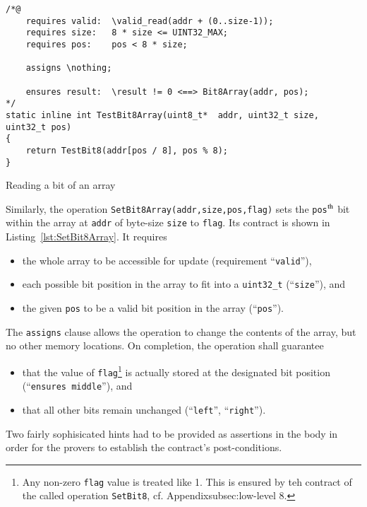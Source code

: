 \begin{listing}[hbt]
\begin{minipage}{0.99\textwidth}
\begin{lstlisting}[style=acsl-block]
/*@
    requires valid:  \valid_read(addr + (0..size-1));
    requires size:   8 * size <= UINT32_MAX;
    requires pos:    pos < 8 * size;

    assigns \nothing;

    ensures result:  \result != 0 <==> Bit8Array(addr, pos);
*/
static inline int TestBit8Array(uint8_t*  addr, uint32_t size, uint32_t pos)
{
    return TestBit8(addr[pos / 8], pos % 8);
}
\end{lstlisting}
\end{minipage}
\caption{\label{lst:TestBit8Array}Reading a bit of an  array}
\end{listing}










Similarly, the operation \lstinline{SetBit8Array(addr,size,pos,flag)} sets the
\lstinline{pos}$^{\mbox{\scriptsize th}}$ bit within the array at \lstinline{addr} of
byte-size \lstinline{size} to \lstinline{flag}.
%
Its contract is shown in Listing~\ref{lst:SetBit8Array}.
%
It requires
%
\begin{itemize}
\item the whole array to be accessible for update (requirement ``\lstinline{valid}''),
\item each possible bit position in the array to fit into a \lstinline{uint32_t}
	(``\lstinline{size}''), and
\item the given \lstinline{pos} to be a valid bit position in the array
	(``\lstinline{pos}'').
\end{itemize}
%
The \lstinline{assigns} clause allows the operation to change the contents of the array,
but no other memory locations.
%
On completion, the operation shall guarantee
\begin{itemize}
\item that the value of \lstinline{flag}\footnote{
	Any non-zero \lstinline{flag} value is treated like 1.
	This is ensured by teh contract of the called operation \lstinline{SetBit8},
	cf. Appendix{subsec:low-level 8}.
	}
	is actually stored at the designated bit
	position (``\lstinline{ensures middle}''), and
\item that all other bits remain unchanged 
	(``\lstinline{left}'', ``\lstinline{right}'').
\end{itemize}
%
Two fairly sophisicated hints had to be provided as assertions in the body in order for
the provers to establish the contract's post-conditions.









